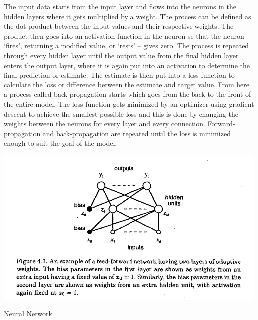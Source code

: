 \documentclass[12pt]{article}
\begin{document}
            The input data starts from the input layer and flows into the neurons in the hidden layers where it gets multiplied by a weight. 
            The process can be defined as the dot product between the input values and their respective weights. 
            The product then goes into an activation function in the neuron 
            so that the neuron ‘fires’, returning a modified value, or ‘rests’ -- gives zero. 
            The process is repeated through every hidden layer until the output value from the final hidden layer enters the output layer, 
            where it is again put into an activation to determine the final prediction or estimate. 
            The estimate is then put into a loss function to calculate the loss or difference between the estimate and target value. 
            From here a process called back-propagation starts which goes from the back to the front of the entire model. 
            The loss function gets minimized by an optimizer using gradient descent to achieve the smallest possible loss 
            and this is done by changing the weights between the neurons for every layer and every connection. 
            Forward-propagation and back-propagation are repeated until the loss is minimized enough to suit the goal of the model.
        
            
            \begin{table}[h]
            
                \begin{center}

                    \includegraphics[scale=1]{neural-network-bishop.png}
                    \caption{Neural Network \cite{bishop1995}}
                    \label{nn-bishop}
        
                \end{center}
                
            \end{table}
\end{document}
